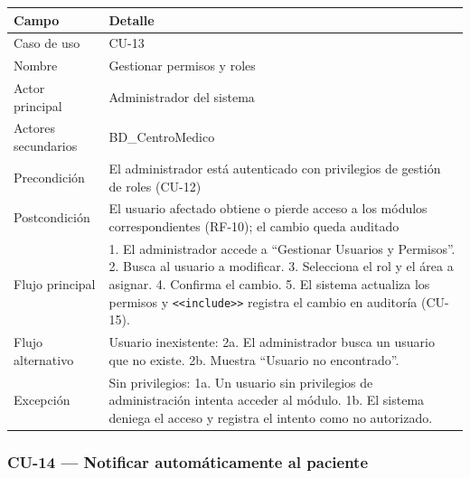 \documentclass[11pt,a4paper]{article}
\begin{document}
	\begin{longtable}{p{} p{} }
		
		
		\toprule
		\textbf{Campo} &
		\textbf{Detalle}  \\
		\midrule
		\endhead
		
		Caso de uso & CU-13 \\
		Nombre & Gestionar permisos y roles \\
		Actor principal & Administrador del sistema \\
		Actores secundarios & BD\_CentroMedico \\
		Precondición & El administrador está autenticado con privilegios de gestión de roles (CU-12) \\
		Postcondición & El usuario afectado obtiene o pierde acceso a los módulos correspondientes (RF-10); el cambio queda auditado \\
		Flujo principal & 1. El administrador accede a ``Gestionar Usuarios y Permisos''. 2. Busca al usuario a modificar. 3. Selecciona el rol y el área a asignar. 4. Confirma el cambio. 5. El sistema actualiza los permisos y \texttt{<<include>>} registra el cambio en auditoría (CU-15). \\
		Flujo alternativo & Usuario inexistente: 2a. El administrador busca un usuario que no existe. 2b. Muestra ``Usuario no encontrado''. \\
		Excepción & Sin privilegios: 1a. Un usuario sin privilegios de administración intenta acceder al módulo. 1b. El sistema deniega el acceso y registra el intento como no autorizado. \\
		\bottomrule
	\end{longtable}
	
	\subsubsection{CU-14 --- Notificar automáticamente al paciente}
	
\end{document}
